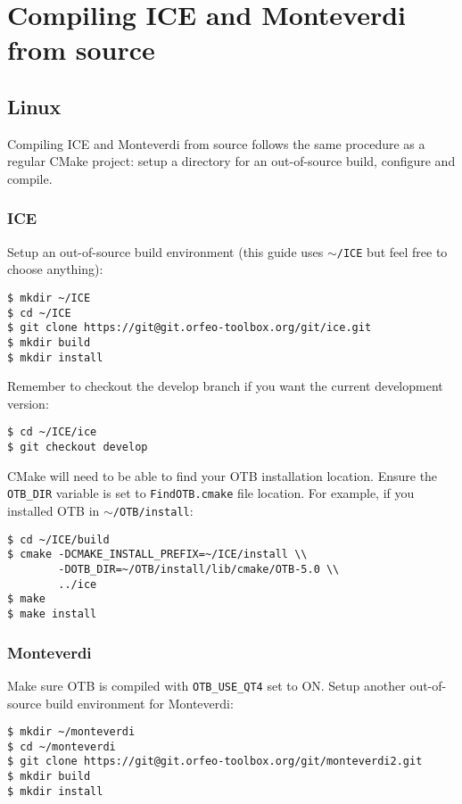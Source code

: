 \setcounter{secnumdepth}{3}

\chapter{Compiling ICE and Monteverdi from source}
\label{chapter:CompilingIceandMonteverdi}

\section{Linux}

Compiling ICE and Monteverdi from source follows the same procedure as a regular CMake project: setup a directory for an
out-of-source build, configure and compile.

\subsection{ICE}

Setup an out-of-source build environment (this guide uses \texttt{$\sim$/ICE} but feel free to choose anything):
\begin{verbatim}
$ mkdir ~/ICE
$ cd ~/ICE
$ git clone https://git@git.orfeo-toolbox.org/git/ice.git
$ mkdir build
$ mkdir install
\end{verbatim}

Remember to checkout the develop branch if you want the current development version:
\begin{verbatim}
$ cd ~/ICE/ice
$ git checkout develop
\end{verbatim}

CMake will need to be able to find your OTB installation location.
Ensure the \texttt{OTB\_DIR} variable is set to \texttt{FindOTB.cmake} file location.
For example, if you installed OTB in \texttt{$\sim$/OTB/install}:
\begin{verbatim}
$ cd ~/ICE/build
$ cmake -DCMAKE_INSTALL_PREFIX=~/ICE/install \\
        -DOTB_DIR=~/OTB/install/lib/cmake/OTB-5.0 \\
        ../ice
$ make
$ make install
\end{verbatim}

\subsection{Monteverdi}

Make sure OTB is compiled with \texttt{OTB\_USE\_QT4} set to ON.
Setup another out-of-source build environment for Monteverdi:
\begin{verbatim}
$ mkdir ~/monteverdi
$ cd ~/monteverdi
$ git clone https://git@git.orfeo-toolbox.org/git/monteverdi2.git
$ mkdir build
$ mkdir install
\end{verbatim}

